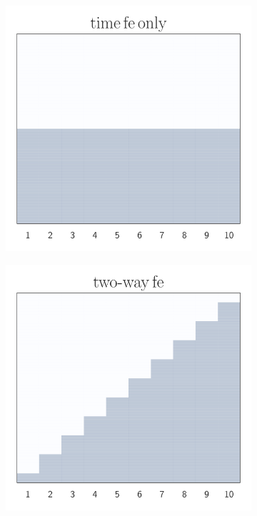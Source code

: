 \begin{figure}[t!]
\begin{subfigure}{0.2\textwidth}
	\end{subfigure}%
	\begin{subfigure}{0.2\textwidth}
		\centering
		\includegraphics[width=1\linewidth]{plots/illustration/time-fe.pdf}
	\end{subfigure}%
	\begin{subfigure}{0.2\textwidth}
		\centering
		\includegraphics[width=1\linewidth]{plots/illustration/two-way-fe.pdf}

\end{subfigure}
\end{figure}
